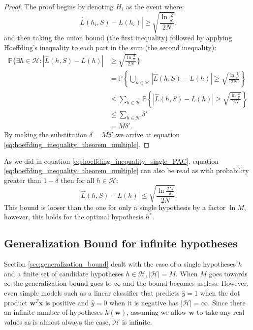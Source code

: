\documentclass[a4paper, twoside, nobib]{tufte-book}
\renewcommand{\vec}[1]{\mathbf{#1}}
\begin{document}
\begin{proof}
  The proof begins by denoting $H_i$ as the event where: 
  \begin{equation*}
    \left| \hat{L}(h_i, S) - L(h_i) \right| \geq \sqrt{\frac{\ln \frac{2}{\delta'}}{2N}},
  \end{equation*}
   and then taking the union bound (the first inequality) followed by applying Hoeffding's inequality to each part in the sum (the second inequality): 
\begin{equation*}
  \begin{split}
    \mathbb{P} \Biggl\{ \exists h \in \mathcal{H}: \left| \hat{L}(h, S) - L(h) \right| &\geq \sqrt{\frac{\ln \frac{2}{\delta'}}{2N}}  \Biggr\} \\
    &= \mathbb{P} \left\{ \bigcup_{h \in \mathcal{H}} \left| \hat{L}(h, S) - L(h) \right| \geq \sqrt{\frac{\ln \frac{2}{\delta'}}{2N}}  \right\}  \\
    &\leq \sum_{h \in \mathcal{H}} \mathbb{P} \left\{\left| \hat{L}(h, S) - L(h) \right| \geq \sqrt{\frac{\ln \frac{2}{\delta'}}{2N}} \right\}  \\
    &\leq \sum_{h \in \mathcal{H}} \delta' \\
    &= M \delta'.
  \end{split}
\end{equation*}
By making the substitution $\delta = M \delta'$ we arrive at equation \eqref{eq:hoeffding_inequality_theorem_multiple}. 
\end{proof}

As we did in equation \eqref{eq:hoeffding_inequality_single_PAC}, equation \eqref{eq:hoeffding_inequality_theorem_multiple} can also be read as with probability greater than $1-\delta$ then for all $h\in\mathcal{H}$:
\begin{equation}
  \label{eq:hoeffding_inequality_multi_PAC}
  \left| \hat{L}(h, S) - L(h) \right| \leq \sqrt{\frac{\ln \frac{2M}{\delta}}{2N}}.
\end{equation}
This bound is looser than the one for only a single hypothesis by a factor $\ln M$, however, this holds for the optimal hypothesis $h^*$. 

\subsection{Generalization Bound for infinite hypotheses}
\label{subsec:generalization_bound_infinite}
Section \ref{sec:generalization_bound} dealt with the case of a single hypotheses $h$ and a finite set of candidate hypotheses $h\in\mathcal{H}, |\mathcal{H}| = M$. When $M$ goes towards $\infty$ the generalization bound goes to $\infty$ and the bound becomes useless. However, even simple models such as a linear classifier that predicts $\hat{y}=1$ when the dot product $\vec{w}^T\vec{x}$ is positive and $\hat{y}=0$ when it is negative has $|\mathcal{H}| = \infty$. Since there an infinite number of hypotheses $h(\vec{w})$, assuming we allow $\vec{w}$ to take any real values as is almost always the case, $\mathcal{H}$ is infinite. 
\end{document}
